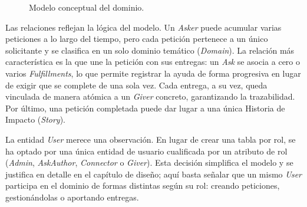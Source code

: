 \documentclass[11pt,oneside,spanish,listoffigures,listoftables]{tfgetsinf}
\begin{document}
\begin{figure}[htbp]
\centering
{}
\caption[Modelo conceptual del dominio]{Modelo conceptual del dominio.}
\label{fig:modelo-conceptual}
\end{figure}

Las relaciones reflejan la lógica del modelo. Un \textit{Asker} puede acumular varias peticiones a lo largo del tiempo, pero cada petición pertenece a un único solicitante y se clasifica en un solo dominio temático (\textit{Domain}). La relación más característica es la que une la petición con sus entregas: un \textit{Ask} se asocia a cero o varios \textit{Fulfillments}, lo que permite registrar la ayuda de forma progresiva en lugar de exigir que se complete de una sola vez. Cada entrega, a su vez, queda vinculada de manera atómica a un \textit{Giver} concreto, garantizando la trazabilidad. Por último, una petición completada puede dar lugar a una única Historia de Impacto (\textit{Story}).

La entidad \textit{User} merece una observación. En lugar de crear una tabla por rol, se ha optado por una única entidad de usuario cualificada por un atributo de rol (\textit{Admin}, \textit{AskAuthor}, \textit{Connector} o \textit{Giver}). Esta decisión simplifica el modelo y se justifica en detalle en el capítulo de diseño; aquí basta señalar que un mismo \textit{User} participa en el dominio de formas distintas según su rol: creando peticiones, gestionándolas o aportando entregas.
\end{document}
